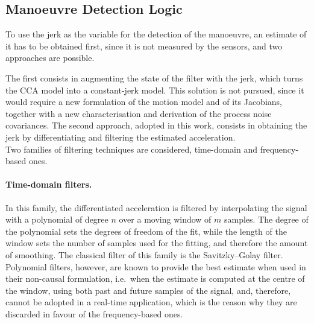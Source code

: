 \subsection{Manoeuvre Detection Logic}
\label{subsec:qff_detection}

To use the jerk as the variable for the detection of the manoeuvre, an estimate of it has to be
obtained first, since it is not measured by the sensors, and two approaches are possible.

The first consists in augmenting the state of the filter with the jerk, which turns the CCA
model into a constant-jerk model. This solution is not pursued, since it would require a new
formulation of the motion model and of its Jacobians, together with a new characterisation and derivation of
the process noise covariances.
The second approach, adopted in this work, consists in obtaining the jerk by differentiating
and filtering the estimated acceleration. \\ Two families of filtering techniques are considered, time-domain
and frequency-based ones.

\paragraph{Time-domain filters.} In this family, the differentiated acceleration is
filtered by interpolating the signal with a polynomial of degree $n$ over a moving window
of $m$ samples. The degree of the polynomial sets the degrees of freedom of the fit,
while the length of the window sets the number of samples used for the fitting, and
therefore the amount of smoothing. The classical filter of this family is the
Savitzky--Golay filter. Polynomial filters, however, are known to provide the best estimate when used in their
non-causal formulation, i.e.\ when the estimate is computed at the centre of the window, using
both past and future samples of the signal, and, therefore, cannot be adopted in a real-time application, which is the reason why they are discarded in favour of the frequency-based ones.

